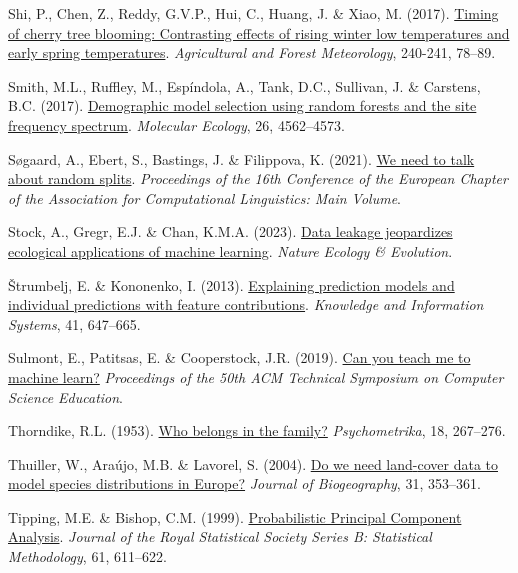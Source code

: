 \documentclass[
  letterpaper,
]{scrbook}
\newlength{\cslhangindent}
\newenvironment{CSLReferences}[2] %
 {\begin{list}{}{%
  \setlength{\itemindent}{0pt}
  \setlength{\leftmargin}{0pt}
  \setlength{\parsep}{0pt}
  \ifodd #1
   \setlength{\leftmargin}{\cslhangindent}
   \setlength{\itemindent}{-1\cslhangindent}
  \fi
  \setlength{\itemsep}{#2\baselineskip}}}
 {\end{list}}
\begin{document}
\begin{CSLReferences}{1}{0}
Shi, P., Chen, Z., Reddy, G.V.P., Hui, C., Huang, J. \& Xiao, M. (2017).
\href{https://doi.org/10.1016/j.agrformet.2017.04.001}{Timing of cherry
tree blooming: Contrasting effects of rising winter low temperatures and
early spring temperatures}. \emph{Agricultural and Forest Meteorology},
240-241, 78--89.

Smith, M.L., Ruffley, M., Espíndola, A., Tank, D.C., Sullivan, J. \&
Carstens, B.C. (2017).
\href{https://doi.org/10.1111/mec.14223}{Demographic model selection
using random forests and the site frequency spectrum}. \emph{Molecular
Ecology}, 26, 4562--4573.

Søgaard, A., Ebert, S., Bastings, J. \& Filippova, K. (2021).
\href{https://doi.org/10.18653/v1/2021.eacl-main.156}{We need to talk
about random splits}. \emph{Proceedings of the 16th Conference of the
European Chapter of the Association for Computational Linguistics: Main
Volume}.

Stock, A., Gregr, E.J. \& Chan, K.M.A. (2023).
\href{https://doi.org/10.1038/s41559-023-02162-1}{Data leakage
jeopardizes ecological applications of machine learning}. \emph{Nature
Ecology \& Evolution}.

Štrumbelj, E. \& Kononenko, I. (2013).
\href{https://doi.org/10.1007/s10115-013-0679-x}{Explaining prediction
models and individual predictions with feature contributions}.
\emph{Knowledge and Information Systems}, 41, 647--665.

Sulmont, E., Patitsas, E. \& Cooperstock, J.R. (2019).
\href{https://doi.org/10.1145/3287324.3287392}{Can you teach me to
machine learn?} \emph{Proceedings of the 50th ACM Technical Symposium on
Computer Science Education}.

Thorndike, R.L. (1953). \href{https://doi.org/10.1007/bf02289263}{Who
belongs in the family?} \emph{Psychometrika}, 18, 267--276.

Thuiller, W., Araújo, M.B. \& Lavorel, S. (2004).
\href{https://doi.org/10.1046/j.0305-0270.2003.00991.x}{Do we need
land{-}cover data to model species distributions in Europe?}
\emph{Journal of Biogeography}, 31, 353--361.

Tipping, M.E. \& Bishop, C.M. (1999).
\href{https://doi.org/10.1111/1467-9868.00196}{Probabilistic Principal
Component Analysis}. \emph{Journal of the Royal Statistical Society
Series B: Statistical Methodology}, 61, 611--622.


\end{CSLReferences}
\end{document}
